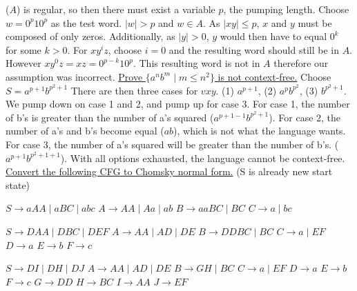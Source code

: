 \documentclass[9pt]{article}
\begin{document}
($A$) is regular, so then there must exist a variable $p$, the pumping length. Choose 
$w = 0^p10^p$ as the test word. $|w|>p$ and $w\in A$. As $|xy|\leq p$, $x$ and $y$ must 
be composed of only zeros. Additionally, as $|y|>0$, $y$ would then have to equal $0^k$ 
for some $k>0$. For $xy^iz$, choose $i=0$ and the resulting word should still be in $A$. 
However $xy^0z=xz = 0^{p-k}10^p$. This resulting word is not in $A$ therefore our 
assumption was incorrect.\newline
\uline{Prove $\{a^nb^m \mid m \leq n^2\}$ is not context-free.} Choose $S = a^{p+1}
b^{p^2+1}$ There are then three cases for $vxy$. (1) $a^{p+1}$, (2) $a^pb^{p^2}$, (3) 
$b^{p^2+1}$. We pump down on case 1 and 2, and pump up for case 3. For case 1, the 
number of b's is greater than the number of a's squared ($a^{p+1-1}b^{p^2+1}$). For 
case 2, the number of a's and b's become equal ($ab$), which is not what the language 
wants. For case 3, the number of a's squared will be greater than the number of b's.
($a^{p+1}b^{p^2+1+1}$). With all options exhausted, the language cannot be context-free.
\newline
\uline{Convert the following CFG to Chomsky normal form.} (S is already new start state)
\newline
\begin{minipage}[t]{.3\textwidth}
$S\rightarrow aAA\mid aBC \mid abc$\newline
$A\rightarrow AA\mid Aa\mid ab$\newline
$B\rightarrow aaBC\mid BC$\newline
$C\rightarrow a\mid bc$
\end{minipage}%
\begin{minipage}[t]{.3\textwidth}
$S\rightarrow DAA\mid DBC \mid DEF$\newline
$A\rightarrow AA\mid AD\mid DE$\newline
$B\rightarrow DDBC\mid BC$\newline
$C\rightarrow a\mid EF$\newline
$D\rightarrow a$\newline
$E\rightarrow b$\newline
$F\rightarrow c$
\end{minipage}%
\begin{minipage}[t]{.3\textwidth}
$S\rightarrow DI\mid DH \mid DJ$\newline
$A\rightarrow AA\mid AD\mid DE$\newline
$B\rightarrow GH\mid BC$\newline
$C\rightarrow a\mid EF$\newline
$D\rightarrow a$\newline
$E\rightarrow b$\newline
$F\rightarrow c$\newline
$G\rightarrow DD$\newline
$H\rightarrow BC$\newline
$I\rightarrow AA$\newline
$J\rightarrow EF$
\end{minipage}\newline
\end{document}

